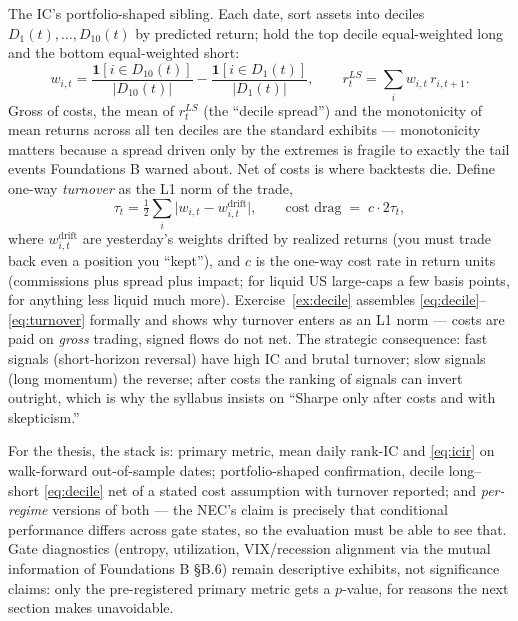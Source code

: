 \documentclass[11pt]{article}
\numberwithin{equation}{section}
\theoremstyle{plain}
\theoremstyle{definition}
\theoremstyle{remark}
\begin{document}
The IC's portfolio-shaped sibling. Each date, sort assets into deciles $D_1(t), \dots, D_{10}(t)$ by predicted return; hold the top decile equal-weighted long and the bottom equal-weighted short:
\begin{equation}
w_{i,t} = \frac{\mathbf{1}[i \in D_{10}(t)]}{|D_{10}(t)|} - \frac{\mathbf{1}[i \in D_{1}(t)]}{|D_{1}(t)|},
\qquad
r^{LS}_t = \sum_i w_{i,t}\, r_{i,t+1} .
\label{eq:decile}
\end{equation}
Gross of costs, the mean of $r^{LS}_t$ (the ``decile spread'') and the monotonicity of mean returns across all ten deciles are the standard exhibits --- monotonicity matters because a spread driven only by the extremes is fragile to exactly the tail events Foundations B warned about. Net of costs is where backtests die. Define one-way \emph{turnover} as the L1 norm of the trade,
\begin{equation}
\tau_t = \tfrac12 \sum_i \big| w_{i,t} - w^{\mathrm{drift}}_{i,t} \big|,
\qquad\text{cost drag} \;=\; c \cdot 2\tau_t ,
\label{eq:turnover}
\end{equation}
where $w^{\mathrm{drift}}_{i,t}$ are yesterday's weights drifted by realized returns (you must trade back even a position you ``kept''), and $c$ is the one-way cost rate in return units (commissions plus spread plus impact; for liquid US large-caps a few basis points, for anything less liquid much more). Exercise~\ref{ex:decile} assembles \eqref{eq:decile}--\eqref{eq:turnover} formally and shows why turnover enters as an L1 norm --- costs are paid on \emph{gross} trading, signed flows do not net. The strategic consequence: fast signals (short-horizon reversal) have high IC and brutal turnover; slow signals (long momentum) the reverse; after costs the ranking of signals can invert outright, which is why the syllabus insists on ``Sharpe only after costs and with skepticism.''

\begin{necbox}
For the thesis, the stack is: primary metric, mean daily rank-IC and \eqref{eq:icir} on walk-forward out-of-sample dates; portfolio-shaped confirmation, decile long--short \eqref{eq:decile} net of a stated cost assumption with turnover reported; and \emph{per-regime} versions of both --- the NEC's claim is precisely that conditional performance differs across gate states, so the evaluation must be able to see that. Gate diagnostics (entropy, utilization, VIX/recession alignment via the mutual information of Foundations B \S B.6) remain descriptive exhibits, not significance claims: only the pre-registered primary metric gets a $p$-value, for reasons the next section makes unavoidable.
\end{necbox}
\end{document}
